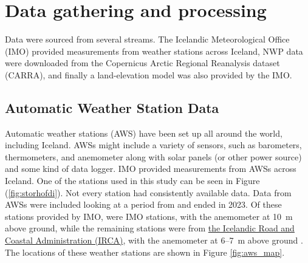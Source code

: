 
\chapter{Data gathering and processing}
\label{Chapter2}
Data were sourced from several streams. The Icelandic Meteorological Office (IMO) provided measurements from weather stations across Iceland, NWP data were downloaded from the Copernicus Arctic Regional Reanalysis dataset (CARRA), and finally a land-elevation model was also provided by the IMO.

\section{Automatic Weather Station Data}

Automatic weather stations (AWS) have been set up all around the world, including Iceland. AWSs might include a variety of sensors, such as barometers, thermometers, and anemometer along with solar panels (or other power source) and some kind of data logger. IMO provided measurements from AWSs across Iceland. One of the stations used in this study can be seen in Figure (\ref{fig:storhofdi}). Not every station had consistently available data. Data from \nStationsMin AWSs were included looking at a period from \startDateVedur and ended in 2023. Of these \nStationsMin stations provided by IMO, \nVedurMin were IMO stations, with the anemometer at 10~m above ground, while the remaining \nVGMin stations were from \href{https://www.vegagerdin.is/}{the Icelandic Road and Coastal Administration (IRCA)}, with the anemometer at 6–7~m above ground \cite{vegagerdin_postur}. The locations of these weather stations are shown in Figure \ref{fig:aws_map}.

